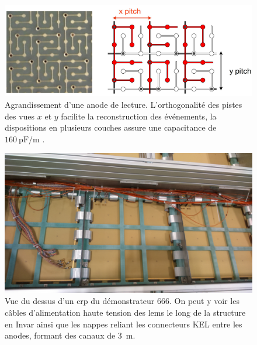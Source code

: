             \begin{figure}[htbp]
                \begin{center}\includegraphics[width=\textwidth,keepaspectratio]{Chapitre_3/pictures/anode.png}\end{center}
                \caption[Agrandissement d'une anode de lecture.]{Agrandissement d'une anode de lecture. L'orthogonalité des pistes des vues $x$ et $y$ facilite la reconstruction des événements, la dispositions en plusieurs couches assure une capacitance de $\SI{160}{\pico\farad\per\meter}$ \cite{cantini3L}.}
                \label{fig::anode}
            \end{figure}
            \begin{figure}[htbp]
                \begin{center}\includegraphics[width=\textwidth,keepaspectratio]{Chapitre_3/pictures/connecteurs2.JPG}\end{center}
                \caption[Vue du dessus d'un \gls{crp} du démonstrateur 666.]{Vue du dessus d'un \gls{crp} du démonstrateur 666. On peut y voir les câbles d'alimentation haute tension des \glspl{lem} le long de la structure en Invar ainsi que les nappes reliant les connecteurs KEL entre les anodes, formant des canaux de \SI{3}{\meter}.}
                \label{fig::connecteurs}
            \end{figure}
            
